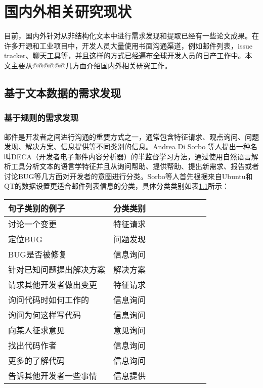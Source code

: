 \chapter{国内外相关研究现状}\label{chap:related_work}

目前，国内外针对从非结构化文本中进行需求发现和提取已经有一些论文成果。在许多开源和工业项目中，开发人员大量使用书面沟通渠道，例如邮件列表，issue tracker、聊天工具等，并且这样的方式已经遍布全球开发人员的日产工作中。本文主要从@@@@@@几方面介绍国内外相关研究工作。

\section{基于文本数据的需求发现}

\subsection{基于规则的需求发现}

邮件是开发者之间进行沟通的重要方式之一，通常包含特征请求、观点询问、问题发现、解决方案、信息提供等不同类别的信息。Andrea Di Sorbo \cite{Sorbo2016Development}等人提出一种名叫DECA（开发者电子邮件内容分析器）的半监督学习方法，通过使用自然语言解析工具分析文本的语言学特征并且从询问帮助、提供帮助、提出新需求、报告或者讨论BUG等几方面对开发者的意图进行分类。Sorbo等人首先根据来自Ubuntu和QT的数据设置更适合邮件列表信息的分类，具体分类类别如表\ref{tab:deca0}所示：

\begin{table}[htbp]
    \label{tab:deca0}
    \centering
    \footnotesize%
    \setlength{\tabcolsep}{4pt}%
    \renewcommand{\arraystretch}{1.2}%
\begin{tabular}{lcccccccc}
\hline
句子类别的例子      & 分类类别 \\
\hline
讨论一个变更       & 特征请求 \\
定位BUG        & 问题发现 \\
BUG是否被修复     & 信息询问 \\
针对已知问题提出解决方案 & 解决方案 \\
请求其他开发者做出变更  & 特征请求 \\
询问代码时如何工作的   & 信息询问 \\
询问为何这样写代码    & 信息询问 \\
向某人征求意见      & 意见询问 \\
找出代码作者       & 信息询问 \\
更多的了解代码      & 信息询问 \\
告诉其他开发者一些事情  & 信息提供 \\
\hline
\end{tabular}
\end{table}


